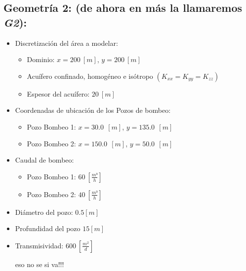 \documentclass[10pt,a4paper,final]{article}
\begin{document}
\subsection*{Geometría 2: (de ahora en más la llamaremos \emph{G2}):}
\label{geometria2}
\begin{itemize}
	\item Discretización del área a modelar:	
	\begin{itemize}
		\item Dominio: $x=200 ~\left[m\right]$, $y=200 ~\left[m\right]$
		\item Acuífero confinado, homogéneo e isótropo $(K_{xx} = K_{yy} = K_{zz})$
		\item Espesor del acuífero: $20 ~\left[m\right]$
	\end{itemize}
	\item Coordenadas de ubicación de los Pozos de bombeo:
	\begin{itemize}
		\item Pozo Bombeo 1: $x=30.0 ~~\left[m\right]$, $y=135.0 ~~\left[m\right]$
		\item Pozo Bombeo 2: $x=150.0~~\left[m\right]$, $y=50.0 ~~\left[m\right]$
	\end{itemize}
	\item Caudal de bombeo:
	\begin{itemize}
		\item Pozo Bombeo 1: $60~\left[\frac{m³}{h}\right]$
		\item Pozo Bombeo 2: $40~\left[\frac{m³}{h}\right]$
	\end{itemize}
	\item Diámetro del pozo: $0.5 [m]$
	\item Profundidad del pozo $15 [m]$
	\item Transmisividad: $600~\left[\frac{m^2}{d}\right]$ \begin{LARGE}
	eso no se si va!!!
	\end{LARGE}\\
\end{itemize}
\end{document}
